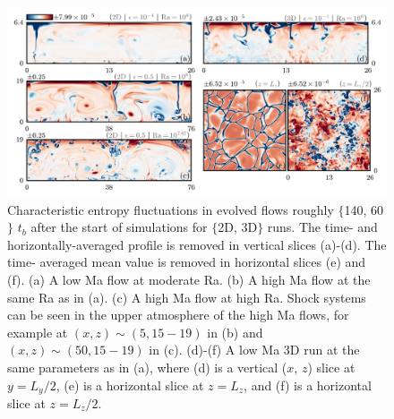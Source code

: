 \begin{figure}[t!]
\includegraphics[width=\textwidth]{./figs/snapshots_fig_raster.pdf}
\caption{Characteristic entropy fluctuations in evolved flows roughly
$\{$140, 60$\}$ $t_b$ after the start of simulations for $\{$2D, 3D$\}$ runs. 
The time- and horizontally-averaged profile is removed in vertical slices (a)-(d). 
The time- averaged mean value is removed in horizontal slices (e) and (f).
(a) A low Ma flow at moderate Ra. (b) A high Ma flow at the same Ra as in (a).
(c) A high Ma flow at high Ra. 
Shock systems can be seen in the upper atmosphere of the high Ma flows,
for example at $(x, z) \sim (5, 15-19)$ in (b) and $(x, z) \sim 
(50, 15-19)$ in (c).
(d)-(f) A low Ma 3D run at the same parameters as in (a),
where (d) is a vertical ($x$, $z$) slice at $y = L_y/2$, (e) is a horizontal slice
at $z = L_z$, and (f) is a horizontal slice at $z = L_z/2$.
\label{fig:entropy_snapshots} }
\end{figure}



